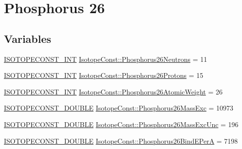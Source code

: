 \hypertarget{group___isotope_const-_phosphorus-_p26}{}\section{Phosphorus 26}
\label{group___isotope_const-_phosphorus-_p26}
\subsection*{Variables}
\begin{DoxyCompactItemize}
\item 
\mbox{\hyperlink{group___isotope_const-_macros_ga5f18360b3e99483a35c32d789e62621c}{I\+S\+O\+T\+O\+P\+E\+C\+O\+N\+S\+T\+\_\+\+I\+NT}} \mbox{\hyperlink{group___isotope_const-_phosphorus-_p26_gaa700150e37540b4d4ca31cc734f89f94}{Isotope\+Const\+::\+Phosphorus26\+Neutrons}} = 11
\item 
\mbox{\hyperlink{group___isotope_const-_macros_ga5f18360b3e99483a35c32d789e62621c}{I\+S\+O\+T\+O\+P\+E\+C\+O\+N\+S\+T\+\_\+\+I\+NT}} \mbox{\hyperlink{group___isotope_const-_phosphorus-_p26_ga18131b86db5990b13621303220534fab}{Isotope\+Const\+::\+Phosphorus26\+Protons}} = 15
\item 
\mbox{\hyperlink{group___isotope_const-_macros_ga5f18360b3e99483a35c32d789e62621c}{I\+S\+O\+T\+O\+P\+E\+C\+O\+N\+S\+T\+\_\+\+I\+NT}} \mbox{\hyperlink{group___isotope_const-_phosphorus-_p26_ga624ff3289a995e37657ba74e9806047a}{Isotope\+Const\+::\+Phosphorus26\+Atomic\+Weight}} = 26
\item 
\mbox{\hyperlink{group___isotope_const-_macros_ga8f45a7272ce02c0b4c65c44636ed719a}{I\+S\+O\+T\+O\+P\+E\+C\+O\+N\+S\+T\+\_\+\+D\+O\+U\+B\+LE}} \mbox{\hyperlink{group___isotope_const-_phosphorus-_p26_ga1d618ff32411305f67c6865d0b99772a}{Isotope\+Const\+::\+Phosphorus26\+Mass\+Exc}} = 10973
\item 
\mbox{\hyperlink{group___isotope_const-_macros_ga8f45a7272ce02c0b4c65c44636ed719a}{I\+S\+O\+T\+O\+P\+E\+C\+O\+N\+S\+T\+\_\+\+D\+O\+U\+B\+LE}} \mbox{\hyperlink{group___isotope_const-_phosphorus-_p26_ga8a71b0100b3feb072460521511055d77}{Isotope\+Const\+::\+Phosphorus26\+Mass\+Exc\+Unc}} = 196
\item 
\mbox{\hyperlink{group___isotope_const-_macros_ga8f45a7272ce02c0b4c65c44636ed719a}{I\+S\+O\+T\+O\+P\+E\+C\+O\+N\+S\+T\+\_\+\+D\+O\+U\+B\+LE}} \mbox{\hyperlink{group___isotope_const-_phosphorus-_p26_ga3fe3c5090d8fac59d3f2648c18bdd2a3}{Isotope\+Const\+::\+Phosphorus26\+Bind\+E\+PerA}} = 7198
\item 

\end{DoxyCompactItemize}
